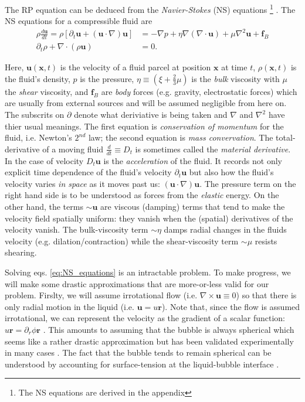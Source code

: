 \documentclass[rmp,aps,nofootinbib,superscriptaddress,floatfix]{revtex4-2}
\begin{document}
The RP equation can be deduced from the \emph{Navier-Stokes} (NS) equations \footnote{The NS equations are derived in the appendix} \cite{prosperetti1999old,brenner2002single,prosperetti1986bubble,plesset1977bubble,suslick2008inside,yasui2018acoustic}. The NS equations for a compressible fluid are
\begin{equation}
\begin{split}
    \rho \frac{d \bm{u}}{dt} = \rho \left[ \partial_t \bm{u}+\left(\bm{u}\cdot \nabla \right)\bm{u} \right] & =-\nabla p + \eta \nabla \left(\nabla \cdot \bm{u} \right)+\mu \nabla^2 \bm{u} + \bm{f}_B \\ 
     \partial_t \rho+\nabla\cdot(\rho \bm{u}) & = 0.
     \label{eq:NS_equations}
\end{split}
\end{equation}

Here, $\bm{u}(\bm{x},t)$ is the velocity of a fluid parcel at position $\bm{x}$ at time $t$, $\rho (\bm{x},t)$ is the fluid's density, $p$ is the pressure, $\eta \equiv \left(\xi + \frac{2}{3}\mu \right)$ is the \emph{bulk} viscosity with $\mu$ the \emph{shear} viscosity, and $\bm{f}_B$ are \emph{body} forces (e.g. gravity, electrostatic forces) which are usually from external sources and will be assumed negligible from here on. The subscrits on $\partial$ denote what deriviative is being taken and $\nabla$ and $\nabla^2$ have thier usual meanings. The first equation is \emph{conservation of momentum} for the fluid, i.e. Newton's $2^{nd}$ law; the second equation is \emph{mass convervation}. The total-derivative of a moving fluid $\frac{d}{dt}\equiv D_t$ is sometimes called the \emph{material derivative}. In the case of velocity $D_t \bm{u}$ is the \emph{acceleration} of the fluid. It records not only explicit time dependence of the fluid's velocity $\partial_t \bm{u}$ but also how the fluid's velocity varies \emph{in space} as it moves past us: $\left( \bm{u}\cdot\nabla \right) \bm{u}$. The pressure term on the right hand side is to be understood as forces from the \emph{elastic} energy. On the other hand, the terms $\sim \bm{u}$ are viscous (damping) terms that tend to make the velocity field spatially uniform: they vanish when the (spatial) derivatives of the velocity vanish. The bulk-viscosity term $\sim \eta$ damps radial changes in the fluids velocity (e.g. dilation/contraction) while the shear-viscosity term $\sim\mu$ resists shearing. 

Solving eqs. \ref{eq:NS_equations} is an intractable problem. To make progress, we will make some drastic approximations that are more-or-less valid for our problem. Firslty, we will assume irrotational flow (i.e. $\nabla\times\bm{u}\equiv 0$) so that there is only radial motion in the liquid (i.e. $\bm{u}=u\bm{r}$). Note that, since the flow is assumed irrotational, we can represent the velocity as the gradient of a scalar function: $u\bm{r}=\partial_r \phi \bm{r}$ \cite{jackson1999classical}. This amounts to assuming that the bubble is always spherical which seems like a rather drastic approximation but has been validated experimentally in many cases \cite{}. The fact that the bubble tends to remain spherical can be understood by accounting for surface-tension at the liquid-bubble interface \cite{prosperetti1999old}. 
\end{document}
